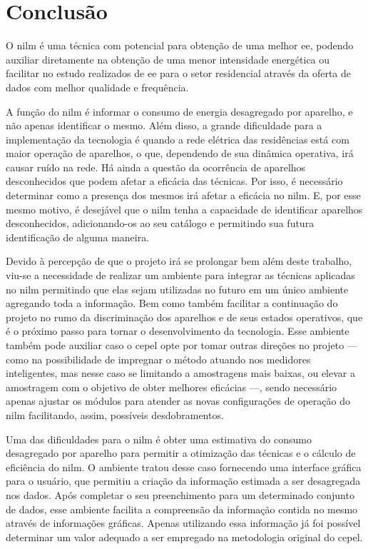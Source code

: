 \chapter{Conclusão}
\label{chap:conclusao}

O \acs{nilm} é uma técnica com potencial para obtenção de uma melhor
\acs{ee}, podendo auxiliar diretamente na obtenção de uma menor
intensidade energética ou facilitar no estudo realizados de \acs{ee}
para o setor residencial através da oferta de dados com melhor
qualidade e frequência.

A função do \acs{nilm} é informar o consumo de energia desagregado por
aparelho, e não apenas identificar o mesmo. Além disso, a grande
dificuldade para a implementação da tecnologia é quando a rede
elétrica das residências está com maior operação de aparelhos, o que,
dependendo de sua dinâmica operativa, irá causar ruído na rede.  Há
ainda a questão da ocorrência de aparelhos desconhecidos que podem
afetar a eficácia das técnicas. Por isso, é necessário determinar como
a presença dos mesmos irá afetar a eficácia no \acs{nilm}. E, por esse
mesmo motivo, é desejável que o \acs{nilm} tenha a capacidade de
identificar aparelhos desconhecidos, adicionando-os ao seu catálogo e
permitindo sua futura identificação de alguma maneira.

Devido à percepção de que o projeto irá se prolongar bem além deste
trabalho, viu-se a necessidade de realizar um ambiente para integrar
as técnicas aplicadas no \acs{nilm} permitindo que elas sejam
utilizadas no futuro em um único ambiente agregando toda a informação.
Bem como também facilitar a continuação do projeto no rumo da
discriminação dos aparelhos e de seus estados operativos, que é o
próximo passo para tornar o desenvolvimento da tecnologia.
Esse ambiente também pode auxiliar caso o \acs{cepel} opte por tomar
outras direções no projeto --- como na possibilidade de impregnar o
método atuando nos medidores inteligentes, mas nesse caso se limitando
a amostragens mais baixas, ou elevar a amostragem com o objetivo de
obter melhores eficácias ---, sendo necessário apenas ajustar os
módulos para atender as novas configurações de operação do \acs{nilm}
facilitando, assim, possíveis desdobramentos. 

Uma das dificuldades para o \acs{nilm} é obter uma estimativa do
consumo desagregado por aparelho para permitir a otimização das
técnicas e o cálculo de eficiência do \acs{nilm}. O ambiente tratou
desse caso fornecendo uma interface gráfica para o usuário, que
permitiu a criação da informação estimada a ser desagregada nos dados.
Após completar o seu preenchimento para um determinado conjunto de
dados, esse ambiente facilita a compreensão da informação contida no
mesmo através de informações gráficas. Apenas utilizando essa
informação já foi possível determinar um valor adequado a ser
empregado na metodologia original do \acs{cepel}.

